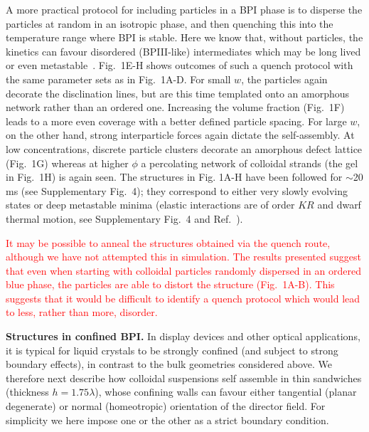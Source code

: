 \documentclass[12pt]{article}
\begin{document}
A more practical protocol for including particles in a BPI phase is to disperse the particles at random in an isotropic phase, and then quenching this into the temperature range where BPI is stable. Here we know that, without particles, the kinetics can favour disordered (BPIII-like) intermediates which may be long lived or even metastable~\cite{domaingrowth}. Fig.~1E-H shows outcomes of such a quench protocol with the same parameter sets as in Fig.~1A-D. For small $w$, the particles again decorate the disclination lines, but are this time templated onto an amorphous network rather than an ordered one.
Increasing the volume fraction (Fig.~1F) leads to a more even coverage with
a better defined particle spacing. 
For large $w$, on the other hand, strong interparticle forces again dictate
the self-assembly. At low concentrations, discrete particle clusters decorate an amorphous defect lattice (Fig.~1G) whereas at higher $\phi$ a percolating network of colloidal strands (the gel in Fig.~1H) is again seen. 
The structures in Fig. 1A-H have been followed for $\sim$20 ms 
(see Supplementary Fig.~4); they correspond to either very slowly evolving
states or  deep metastable minima (elastic interactions are of
order $KR$ and dwarf thermal motion, see
Supplementary Fig.~4 and Ref.~\cite{stark,lavrentovich}).

\textcolor{red}{
It may be possible to anneal the structures obtained via the quench route,
although we have not attempted this in simulation. The results presented
suggest that even when starting with colloidal particles randomly dispersed
in an ordered blue phase, the particles are able to distort the structure
(Fig.~1A-B). This suggests that it would be difficult to identify a quench
protocol which would lead to less, rather than more, disorder.
}

\medskip
\noindent
\textbf{Structures in confined BPI.}
In display devices and other optical applications, it is typical for liquid crystals to be strongly confined (and subject to strong boundary effects), in contrast to the bulk geometries considered above. We therefore next describe how colloidal suspensions self assemble in thin sandwiches (thickness $h = 1.75 \lambda$), whose confining walls can favour either tangential (planar degenerate) or normal (homeotropic) orientation of the director field. For simplicity we here impose one or the other as a strict boundary condition.
\end{document}

